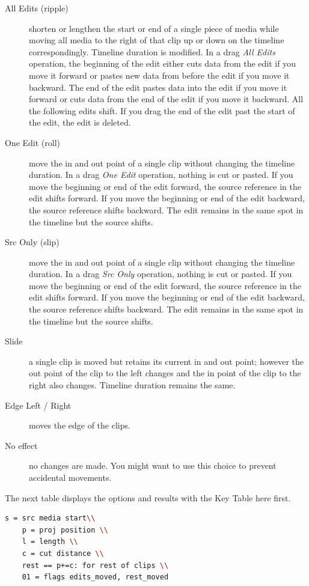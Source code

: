 \begin{description}
    \item[All Edits (ripple)] shorten or lengthen the start or end of a single piece of media while moving all media to the right of that clip up or down on the timeline correspondingly.  Timeline duration is modified.  In a drag \textit{All Edits} operation, the beginning of the edit either cuts data from the edit if you move it forward or pastes new data from before the edit if you move it backward. The end of the edit pastes data into the edit if you move it forward or cuts data from the end of the edit if you move it backward. All the following edits shift. If you drag the end of the edit past the start of the edit, the edit is deleted.
    \item[One Edit (roll)] move the in and out point of a single clip without changing the timeline duration. In a drag \textit{One Edit} operation, nothing is cut or pasted. If you move the beginning or end of the edit forward, the source reference in the edit shifts forward. If you move the beginning or end of the edit backward, the source reference shifts backward. The edit remains in the same spot in the timeline but the source shifts.
    \item[Src Only (slip)] move the in and out point of a single clip without changing the timeline duration. In a drag \textit{Src Only} operation, nothing is cut or pasted. If you move the beginning or end of the edit forward, the source reference in the edit shifts forward. If you move the beginning or end of the edit backward, the source reference shifts backward. The edit remains in the same spot in the timeline but the source shifts.
    \item[Slide] a single clip is moved but retains its current in and out point; however the out point of the clip to the left changes and the in point of the clip to the right also changes.  Timeline duration remains the same.
    \item[Edge Left / Right] moves the edge of the clips.
    \item[No effect] no changes are made.  You might want to use this choice to prevent accidental movements.
\end{description}
The next table displays the options and results with the Key Table here first.

\begin{lstlisting}[language=bash,numbers=none]
    s = src media start\\
    p = proj position \\
    l = length \\
    c = cut distance \\
    rest == p+=c: for rest of clips \\
    01 = flags edits_moved, rest_moved
\end{lstlisting}


